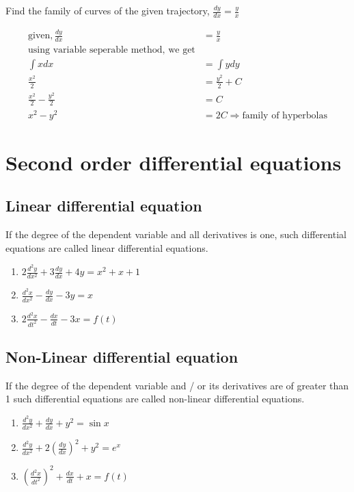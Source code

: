 \begin{exercise}
	Find the family of curves of the given trajectory,	$\frac{dy}{dx}=\frac{y}{x}$
\end{exercise}
\begin{answer}
\begin{align*}
\text{given},\frac{dy}{dx}&=\frac{y}{x}\\
\text{using variable seperable method, we get}\\
\int xdx&=\int ydy\\
\frac{x^{2}}{2}&=\frac{y^{2}}{2}+C\\
\frac{x^{2}}{2}-\frac{y^{2}}{2}&=C\\
x^{2}-y^{2}&=2C\Longrightarrow \text{family of hyperbolas}
\end{align*}
\end{answer}
\section{Second order differential equations}
\subsection{Linear differential equation}
If the degree of the dependent variable and all derivatives is one, such differential equations are called linear differential equations.
\begin{example}\hspace{0.5cm}
	\begin{enumerate}
		\item $2\frac{d^{2} y}{d x^{2}}+3\frac{d y}{d x}+4 y=x^{2}+x+1$
		\item $ \frac{d^{2} x}{d x^{2}}-\frac{d y}{d x}-3 y=x$
		\item $2 \frac{d^{2} x}{d t^{2}}-\frac{d x}{d t}-3 x=f(t)$
	\end{enumerate}
\end{example}
\subsection{Non-Linear differential equation}
If the degree of the dependent variable and / or its derivatives are of greater than 1 such differential equations are called non-linear differential equations.
\begin{example}\hspace{0.5cm}
	\begin{enumerate}
		\item $\frac{d^{2} y}{d x^{2}}+\frac{d y}{d x}+y^{2}=\sin x$
		\item  $\frac{d^{2} y}{d x^{2}}+2\left(\frac{d y}{d x}\right)^{2}+y^{2}=e^{x}$
		\item  $\left(\frac{d^{2} x}{d t^{2}}\right)^{2}+\frac{d x}{d t}+x=f(t)$
	\end{enumerate}
\end{example}
